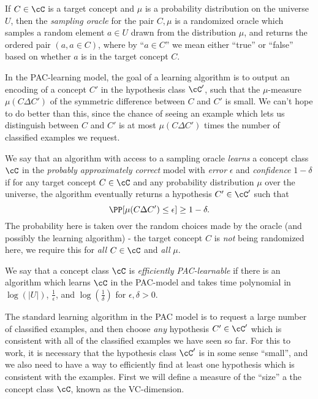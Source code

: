 \begin{defn} If $C \in \cC$ is a target concept and $\mu$ is a probability distribution on the universe $U$, then the \emph{sampling oracle} for the pair $C,\mu$ is a randomized oracle which samples a random element $a \in U$ drawn from the distribution $\mu$, and returns the ordered pair $(a,a \in C)$, where by ``$a \in C$'' we mean either ``true'' or ``false'' based on whether $a$ is in the target concept $C$.
\end{defn}

In the PAC-learning model, the goal of a learning algorithm is to output an encoding of a concept $C'$ in the hypothesis class $\cC'$, such that the $\mu$-measure $\mu(C \Delta C')$ of the symmetric difference between $C$ and $C'$ is small. We can't hope to do better than this, since the chance of seeing an example which lets us distinguish between $C$ and $C'$ is at most $\mu(C \Delta C')$ times the number of classified examples we request.

\begin{defn} We say that an algorithm with access to a sampling oracle \emph{learns} a concept class $\cC$ in the \emph{probably approximately correct} model with \emph{error} $\epsilon$ and \emph{confidence} $1-\delta$ if for any target concept $C \in \cC$ and any probability distribution $\mu$ over the universe, the algorithm eventually returns a hypothesis $C' \in \cC'$ such that
\[
\PP[\mu(C \Delta C') \le \epsilon] \ge 1 - \delta.
\]
The probability here is taken over the random choices made by the oracle (and possibly the learning algorithm) - the target concept $C$ is \emph{not} being randomized here, we require this for \emph{all} $C \in \cC$ and \emph{all} $\mu$.

We say that a concept class $\cC$ is \emph{efficiently PAC-learnable} if there is an algorithm which learns $\cC$ in the PAC-model and takes time polynomial in $\log(|U|)$, $\frac{1}{\epsilon}$, and $\log(\frac{1}{\delta})$ for $\epsilon, \delta > 0$.
\end{defn}

The standard learning algorithm in the PAC model is to request a large number of classified examples, and then choose \emph{any} hypothesis $C' \in \cC'$ which is consistent with all of the classified examples we have seen so far. For this to work, it is necessary that the hypothesis class $\cC'$ is in some sense ``small'', and we also need to have a way to efficiently find at least one hypothesis which is consistent with the examples. First we will define a measure of the ``size'' a the concept class $\cC$, known as the VC-dimension.

